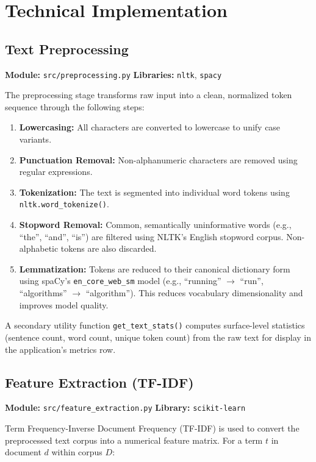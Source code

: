 \documentclass[12pt, a4paper]{article}
\begin{document}
\section{Technical Implementation}

\subsection{Text Preprocessing}
\textbf{Module:} \texttt{src/preprocessing.py} \quad \textbf{Libraries:} \texttt{nltk}, \texttt{spacy}

The preprocessing stage transforms raw input into a clean, normalized token sequence through the following steps:

\begin{enumerate}
  \item \textbf{Lowercasing:} All characters are converted to lowercase to unify case variants.
  \item \textbf{Punctuation Removal:} Non-alphanumeric characters are removed using regular expressions.
  \item \textbf{Tokenization:} The text is segmented into individual word tokens using \texttt{nltk.word\_tokenize()}.
  \item \textbf{Stopword Removal:} Common, semantically uninformative words (e.g., ``the'', ``and'', ``is'') are filtered using NLTK's English stopword corpus. Non-alphabetic tokens are also discarded.
  \item \textbf{Lemmatization:} Tokens are reduced to their canonical dictionary form using spaCy's \texttt{en\_core\_web\_sm} model (e.g., ``running'' $\to$ ``run'', ``algorithms'' $\to$ ``algorithm''). This reduces vocabulary dimensionality and improves model quality.
\end{enumerate}

A secondary utility function \texttt{get\_text\_stats()} computes surface-level statistics (sentence count, word count, unique token count) from the raw text for display in the application's metrics row.

\subsection{Feature Extraction (TF-IDF)}
\textbf{Module:} \texttt{src/feature\_extraction.py} \quad \textbf{Library:} \texttt{scikit-learn}

Term Frequency-Inverse Document Frequency (TF-IDF) is used to convert the preprocessed text corpus into a numerical feature matrix. For a term $t$ in document $d$ within corpus $D$:
\end{document}
